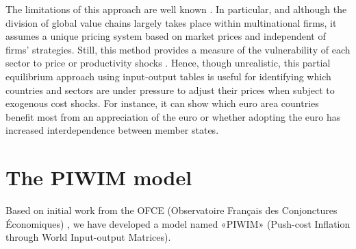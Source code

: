 \documentclass[11pt,a4paper]{article}
\begin{document}
The limitations of this approach are well known \citep{Folloni1994}. In particular, and although the division of global value chains largely takes place within multinational firms, it assumes a unique pricing system based on market prices and independent of firms' strategies. Still, this method provides a measure of the vulnerability of each sector to price or productivity shocks \citep{Acemoglu2012,Carvalho2014}. 
Hence, though unrealistic, this partial equilibrium approach using input-output tables is useful for identifying which countries and sectors are under pressure to adjust their prices when subject to exogenous cost shocks. For instance, it can show which euro area countries benefit most from an appreciation of the euro or whether adopting the euro has increased interdependence between member states.


\section{The PIWIM model }
\label{sec:metho}

Based on initial work from the OFCE (Observatoire Français des Conjonctures Économiques) \cite{Cochard2016}, we have developed a model named «PIWIM» (Push-cost Inflation through World Input-output Matrices). 
\end{document}
